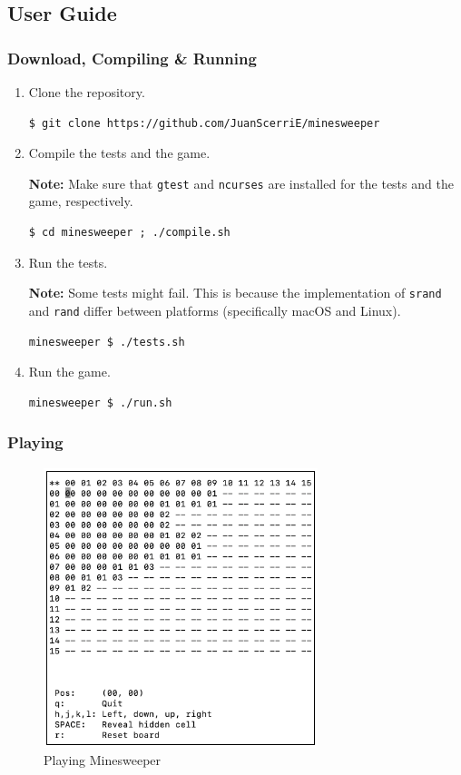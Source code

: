 \documentclass[12pt]{article}
\begin{document}
\subsection{User Guide}

\subsubsection{Download, Compiling \& Running}

\begin{enumerate}
\item
    Clone the repository.
\begin{lstlisting}
$ git clone https://github.com/JuanScerriE/minesweeper
\end{lstlisting}

\item
    Compile the tests and the game.

    \textbf{Note:} Make sure that \texttt{gtest} and
    \texttt{ncurses} are installed for the tests and the game,
    respectively.
\begin{lstlisting}
$ cd minesweeper ; ./compile.sh
\end{lstlisting}

\item
    Run the tests.

    \textbf{Note:} Some tests might fail. This is because the
    implementation of \texttt{srand} and \texttt{rand} differ
    between platforms (specifically macOS and Linux).
\begin{lstlisting}
minesweeper $ ./tests.sh
\end{lstlisting}

\item
    Run the game.
\begin{lstlisting}
minesweeper $ ./run.sh
\end{lstlisting}

\end{enumerate}

\subsubsection{Playing}

\begin{figure}[H]
    \centering
    \includegraphics[width=8cm]{./images/playing-minesweeper.png}
    \caption{Playing Minesweeper}
    \label{playing-minesweeper}
\end{figure}
\end{document}
